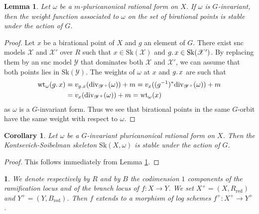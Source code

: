 \documentclass{amsart}%
\numberwithin{equation}{subsection}
\theoremstyle{plain2}
\newtheorem{cor}[equation]{Corollary}
\newtheorem{lemma}[equation]{Lemma}
\theoremstyle{definition2}
\theoremstyle{stepstyle}
\theoremstyle{point}
\theoremstyle{subpoint}
\newtheorem{subpoint}[equation]{}%
\newcommand{\spa}[1]{\begin{subpoint}#1\end{subpoint}}           %
\newcommand{\cX}{\ensuremath{\mathscr{X}}}
\newcommand{\cY}{\ensuremath{\mathscr{Y}}}
\renewcommand{\cY}{\ensuremath{\mathscr{Y}}}
\newcommand{\redu}{\mathrm{red}}
\newcommand{\divisor}{\mathrm{div}}
\newcommand{\weight}{\mathrm{wt}}
\newcommand{\Sk}{\mathrm{Sk}}
\begin{document}
\begin{lemma} \label{lemma G invariant forms and weight function}
Let $\omega$ be a $m$-pluricanonical rational form on $X$. If $\omega$ is $G$-invariant, then the weight function associated to $\omega$ on the set of birational points is stable under the action of $G$. 
\end{lemma}
\begin{proof}
Let $x$ be a birational point of $X$ and $g$ an element of $G$. There exist snc models $\cX$ and $\cX'$ over $R$ such that $x \in \Sk(\cX)$ and $g \ldotp x \in \Sk(\cX')$. By replacing them by an snc model $\cY$ that dominates both $\cX$ and $\cX'$, we can assume that both points lies in $\Sk(\cY)$. The weights of $\omega$ at $x$ and $g \ldotp x$ are such that \begin{align*} \weight_{\omega}(g \ldotp x)& = v_{g \ldotp x}(\divisor_{\cY^+}(\omega)) + m  = v_{x}((g^{-1})^*\divisor_{\cY^+}(\omega)) + m  \\ & = v_{x}(\divisor_{\cY^+}(\omega)) + m = \weight_{\omega}(x) \end{align*} as $\omega$ is a $G$-invariant form. Thus we see that birational points in the same $G$-orbit have the same weight with respect to $\omega$. 
\end{proof}

\begin{cor} \label{cor:G inv forms and KS}
Let $\omega$ be a $G$-invariant pluricanonical rational form on $X$. Then the Kontsevich-Soibelman skeleton $\Sk(X,\omega)$ is stable under the action of $G$.
\end{cor}
\begin{proof}
This follows immediately from Lemma \ref{lemma G invariant forms and weight function}.
\end{proof}

\spa{We denote respectively by $R$ and by $B$ the codimension $1$ components of the ramification locus and of the branch locus of $f:X \rightarrow Y$. We set $X^+=(X,R_\redu)$ and $Y^+=(Y,B_\redu)$. Then $f$ extends to a morphism of log schemes $f^+:X^+ \rightarrow Y^+$.
}
\end{document}
